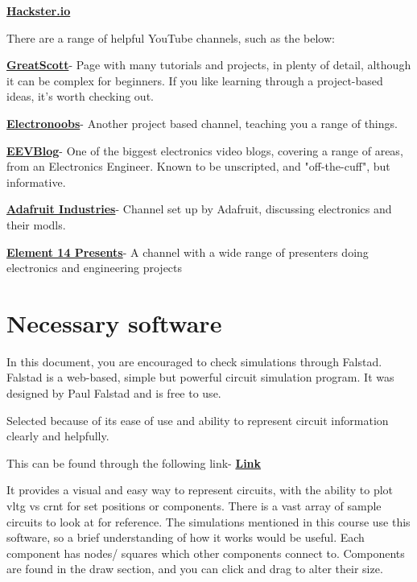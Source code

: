 \documentclass[a4paper,11pt]{report}
\let\oldhref\href %
\renewcommand{\href}[2]{\oldhref{#1}{\bfseries#2}}
\begin{document}
\href{https://www.hackster.io/}{Hackster.io}

There are a range of helpful YouTube channels, such as the below:

\href{https://www.youtube.com/c/greatscottlab}{GreatScott}- Page with many tutorials and projects, in plenty of detail, although it can be complex for beginners. If you like learning through a project-based ideas, it's worth checking out.

\href{https://www.youtube.com/c/ELECTRONOOBS}{Electronoobs}- Another project based channel, teaching you a range of things.

\href{https://www.youtube.com/c/EevblogDave}{EEVBlog}- One of the biggest electronics video blogs, covering a range of areas, from an Electronics Engineer. Known to be unscripted, and "off-the-cuff", but informative.

\href{https://www.youtube.com/c/adafruit}{Adafruit Industries}- Channel set up by Adafruit, discussing electronics and their \gls{modl}s.

\href{https://www.youtube.com/c/element14presents/videos}{Element 14 Presents}- A channel with a wide range of presenters doing electronics and engineering projects

\pagebreak

\section{Necessary software}

In this document, you are encouraged to check simulations through Falstad. Falstad is a web-based, simple but powerful circuit simulation program. It was designed by Paul Falstad and is free to use.

Selected because of its ease of use and ability to represent circuit information clearly and helpfully.

This can be found through the following link- \href{https://falstad.com/circuit/}{Link}

It provides a visual and easy way to represent circuits, with the ability to plot \gls{vltg} vs \gls{crnt} for set positions or components. There is a vast array of sample circuits to look at for reference. The simulations mentioned in this course use this software, so a brief understanding of how it works would be useful. Each component has nodes/ squares which other components connect to. Components are found in the draw section, and you can click and drag to alter their size.
\end{document}
